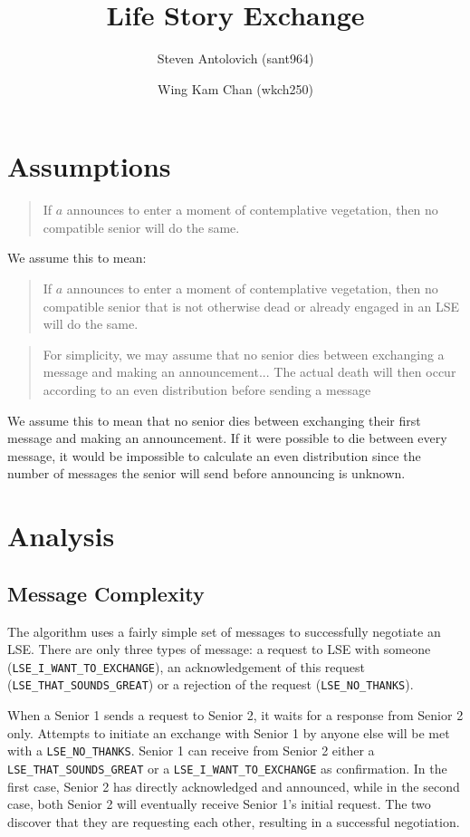 \documentclass[a4paper]{article}
\title{Life Story Exchange}
\author{Steven Antolovich (sant964) \and Wing Kam Chan (wkch250)}
\begin{document}
\maketitle

\section{Assumptions}
\begin{quote}
If $a$ announces to enter a moment of contemplative vegetation, then no compatible senior will do the same.
\end{quote}
We assume this to mean:
\begin{quote}
If $a$ announces to enter a moment of contemplative vegetation, then no compatible senior that is not otherwise dead or already engaged in an LSE will do the same.
\end{quote}

\begin{quote}
For simplicity, we may assume that no senior dies between exchanging a message and making an announcement... The actual death will then occur according to an even distribution before sending a message
\end{quote}
We assume this to mean that no senior dies between exchanging their first message and making an announcement. If it were possible to die between every message, it would be impossible to calculate an even distribution since the number of messages the senior will send before announcing is unknown.

\section{Analysis}
\subsection{Message Complexity}
The algorithm uses a fairly simple set of messages to successfully negotiate an LSE. There are only three types of message: a request to LSE with someone (\texttt{LSE\_I\_WANT\_TO\_EXCHANGE}), an acknowledgement of this request (\texttt{LSE\_THAT\_SOUNDS\_GREAT}) or a rejection of the request (\texttt{LSE\_NO\_THANKS}). 

When a Senior 1 sends a request to Senior 2, it waits for a response from Senior 2 only. Attempts to initiate an exchange with Senior 1 by anyone else will be met with a \texttt{LSE\_NO\_THANKS}. Senior 1 can receive from Senior 2 either a \texttt{LSE\_THAT\_SOUNDS\_GREAT} or a \texttt{LSE\_I\_WANT\_TO\_EXCHANGE} as confirmation. In the first case, Senior 2 has directly acknowledged and announced, while in the second case, both Senior 2 will eventually receive Senior 1's initial request. The two discover that they are requesting each other, resulting in a successful negotiation. 
\end{document}
